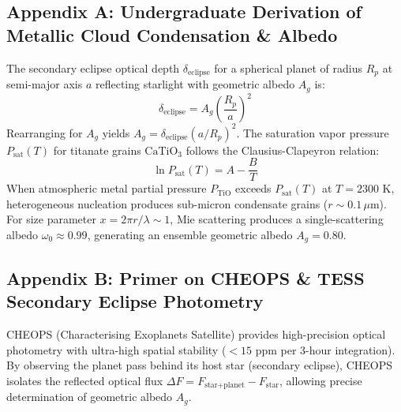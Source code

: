 \documentclass[11pt,a4paper]{article}
\begin{document}
\subsection*{Appendix A: Undergraduate Derivation of Metallic Cloud Condensation \& Albedo}
The secondary eclipse optical depth $\delta_{\text{eclipse}}$ for a spherical planet of radius $R_p$ at semi-major axis $a$ reflecting starlight with geometric albedo $A_g$ is:
\begin{equation}
\delta_{\text{eclipse}} = A_g \left(\frac{R_p}{a}\right)^2
\end{equation}
Rearranging for $A_g$ yields $A_g = \delta_{\text{eclipse}} (a / R_p)^2$.
The saturation vapor pressure $P_{\text{sat}}(T)$ for titanate grains $\text{CaTiO}_3$ follows the Clausius-Clapeyron relation:
\begin{equation}
\ln P_{\text{sat}}(T) = A - \frac{B}{T}
\end{equation}
When atmospheric metal partial pressure $P_{\text{TiO}}$ exceeds $P_{\text{sat}}(T)$ at $T = 2300\text{ K}$, heterogeneous nucleation produces sub-micron condensate grains ($r \sim 0.1\,\mu$m). For size parameter $x = 2\pi r / \lambda \sim 1$, Mie scattering produces a single-scattering albedo $\omega_0 \approx 0.99$, generating an ensemble geometric albedo $A_g = 0.80$.

\subsection*{Appendix B: Primer on CHEOPS \& TESS Secondary Eclipse Photometry}
CHEOPS (Characterising Exoplanets Satellite) provides high-precision optical photometry with ultra-high spatial stability ($< 15\text{ ppm}$ per 3-hour integration). By observing the planet pass behind its host star (secondary eclipse), CHEOPS isolates the reflected optical flux $\Delta F = F_{\text{star+planet}} - F_{\text{star}}$, allowing precise determination of geometric albedo $A_g$.
\end{document}
